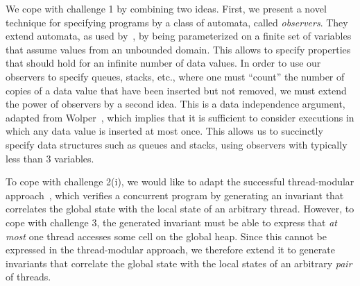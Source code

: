 We cope with challenge 1 by combining two ideas. First,
we present a novel technique for specifying
programs by a class of automata, called {\em observers}.
They extend automata, as used by~\cite{VW:modelchecking},
by being parameterized on
a finite set of variables that assume values from an unbounded domain.
This allows to specify properties that should hold for an infinite number of
data values.
In order to use our observers to specify queues, stacks, etc., where one
must ``count'' the number of copies of a data value that have been inserted but
not removed, we must extend the power of observers by a second idea.
This is a data independence argument, adapted  from
Wolper~\cite{Wolper:dataindependence}, which 
implies that it is sufficient to consider executions in which
any data value is inserted at most once.
This allows us to succinctly specify data structures such as queues and 
stacks, using observers with typically less than $3$ variables.

To cope with challenge 2(i), we would like to adapt the successful
thread-modular approach~\cite{BLMRS:cav08},
which verifies a concurrent program by generating an invariant
that correlates the global state with the local state of an arbitrary thread.
However, to cope with challenge 3, the generated invariant must be able
to express that {\em at most} one thread accesses some
cell on the global heap. Since this cannot be expressed in the
thread-modular approach, we therefore extend it to
generate
invariants that correlate the global state with the local states of an
arbitrary {\em pair} of threads.

